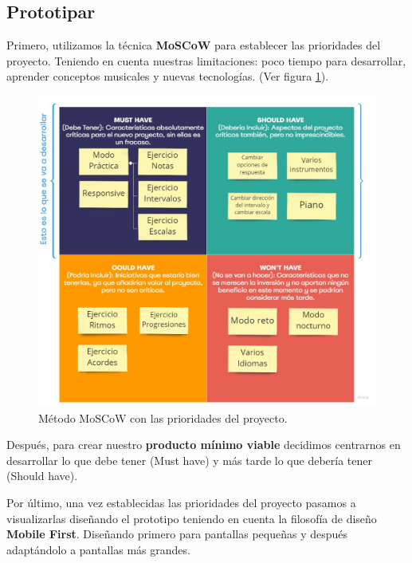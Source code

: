 \documentclass[12pt,twoside,titlepage]{report}
\begin{document}
\subsection{Prototipar}

Primero, utilizamos la técnica \textbf{MoSCoW} para establecer las prioridades del proyecto. Teniendo en cuenta nuestras limitaciones: poco tiempo para desarrollar, aprender conceptos musicales y nuevas tecnologías. 
(Ver figura \ref{fig:MoSCoW}).

\begin{figure}[H]
    \centering
    \includegraphics[scale=0.35]{Design Thinking/MosCow}
    \caption{Método MoSCoW con las prioridades del proyecto.}
    \label{fig:MoSCoW}
\end{figure}

Después, para crear nuestro \textbf{producto mínimo viable} decidimos centrarnos en desarrollar lo que debe tener (Must have) y más tarde lo que debería tener (Should have).

Por último, una vez establecidas las prioridades del proyecto pasamos a visualizarlas diseñando el prototipo teniendo en cuenta la filosofía de diseño \textbf{Mobile First}. Diseñando primero para pantallas pequeñas y después adaptándolo a pantallas más grandes. 
\end{document}
